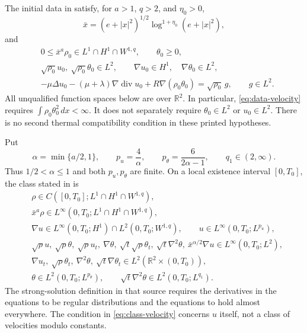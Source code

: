 \documentclass[10pt,twoside]{article}
\newcommand{\R}{\mathbb R}
\newcommand{\dd}{\,dx}
\newcommand{\Div}{\operatorname{div}}
\begin{document}
The initial data in \cite[Theorem 1.1]{Wang} satisfy, for $a>1$, $q>2$,
and $\eta_0>0$,
\begin{equation}\label{eq:weight}
 \bar{x}=(e+|x|^2)^{1/2}\log^{1+\eta_0}(e+|x|^2),
\end{equation}
and
\begin{align}
 &0\le\bar{x}^{a}\rho_0\in L^1\cap H^1\cap W^{1,q},
       \qquad \theta_0\ge0, \label{eq:data-density}\\
 &\sqrt{\rho_0}u_0,\ \sqrt{\rho_0}\theta_0\in L^2,\qquad
       \nabla u_0\in H^1,\quad \nabla\theta_0\in L^2,
       \label{eq:data-velocity}\\
 &-\mu\Delta u_0-(\mu+\lambda)\nabla\Div u_0
       +R\nabla(\rho_0\theta_0)=\sqrt{\rho_0}\,g,
       \qquad g\in L^2. \label{eq:compatibility}
\end{align}
All unqualified function spaces below are over $\R^2$.
In particular, \eqref{eq:data-velocity} requires
$\int\rho_0\theta_0^2\dd<\infty$.
It does not separately require $\theta_0\in L^2$ or $u_0\in L^2$.
There is no second thermal compatibility condition in these printed
hypotheses.

Put
\begin{equation}\label{eq:exponents}
 \alpha=\min\{a/2,1\},\qquad p_u=\frac4\alpha,\qquad
 p_\theta=\frac6{2\alpha-1},\qquad q_1\in(2,\infty).
\end{equation}
Thus $1/2<\alpha\le1$ and both $p_u,p_\theta$ are finite.
On a local existence interval $[0,T_0]$, the class stated in
\cite[(1.8)--(1.9)]{Wang} is
\begin{align}
 &\rho\in C([0,T_0];L^1\cap H^1\cap W^{1,q}),\nonumber\\
 &\bar{x}^{a}\rho\in L^\infty(0,T_0;L^1\cap H^1\cap W^{1,q}),
       \label{eq:class-density}\\
 &\nabla u\in L^\infty(0,T_0;H^1)
                  \cap L^2(0,T_0;W^{1,q}),\qquad
 u\in L^\infty(0,T_0;L^{p_u}),\label{eq:class-velocity}\\
 &\sqrt\rho u,\ \sqrt\rho\theta,\ \sqrt\rho u_t,\ \nabla\theta,\
   \sqrt t\sqrt\rho\theta_t,\ \sqrt t\nabla^2\theta,\
   \bar{x}^{\alpha/2}\nabla u
      \in L^\infty(0,T_0;L^2), \label{eq:class-bounded}\\
 &\nabla u_t,\ \sqrt\rho\theta_t,\ \nabla^2\theta,\
       \sqrt t\nabla\theta_t
      \in L^2(\R^2\times(0,T_0)), \label{eq:class-integrated}\\
 &\theta\in L^2(0,T_0;L^{p_\theta}),\qquad
   \sqrt t\nabla^2\theta\in L^2(0,T_0;L^{q_1}).
       \label{eq:class-temperature}
\end{align}
The strong-solution definition in that source requires the derivatives in
the equations to be regular distributions and the equations to hold almost
everywhere. The condition in \eqref{eq:class-velocity} concerns $u$
itself, not a class of velocities modulo constants.
\end{document}
